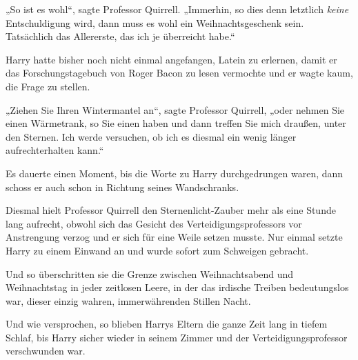 „So ist es wohl“, sagte Professor Quirrell. „Immerhin, so dies denn letztlich \emph{keine} Entschuldigung wird, dann muss es wohl ein Weihnachtsgeschenk sein. Tatsächlich das Allererste, das ich je überreicht habe.“

Harry hatte bisher noch nicht einmal angefangen, Latein zu erlernen, damit er das Forschungstagebuch von Roger Bacon zu lesen vermochte und er wagte kaum, die Frage zu stellen.

„Ziehen Sie Ihren Wintermantel an“, sagte Professor Quirrell, „oder nehmen Sie einen Wärmetrank, so Sie einen haben und dann treffen Sie mich draußen, unter den Sternen. Ich werde versuchen, ob ich es diesmal ein wenig länger aufrechterhalten kann.“

Es dauerte einen Moment, bis die Worte zu Harry durchgedrungen waren, dann schoss er auch schon in Richtung seines Wandschranks.

Diesmal hielt Professor Quirrell den Sternenlicht-Zauber mehr als eine Stunde lang aufrecht, obwohl sich das Gesicht des Verteidigungsprofessors vor Anstrengung verzog und er sich für eine Weile setzen musste. Nur einmal setzte Harry zu einem Einwand an und wurde sofort zum Schweigen gebracht.

Und so überschritten sie die Grenze zwischen Weihnachtsabend und Weihnachtstag in jeder zeitlosen Leere, in der das irdische Treiben bedeutungslos war, dieser einzig wahren, immerwährenden Stillen Nacht.

Und wie versprochen, so blieben Harrys Eltern die ganze Zeit lang in tiefem Schlaf, bis Harry sicher wieder in seinem Zimmer und der Verteidigungsprofessor verschwunden war.
